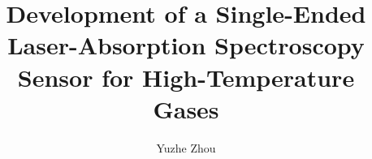 \documentclass[ece,dissertation]{puthesis}
\title{Development of a Single-Ended Laser-Absorption Spectroscopy Sensor for High-Temperature Gases}
\author{Yuzhe Zhou}{Zhou, Yuzhe}
\begin{document}
\volume







%








\appendix


%
%
%
%


%
\end{document}
